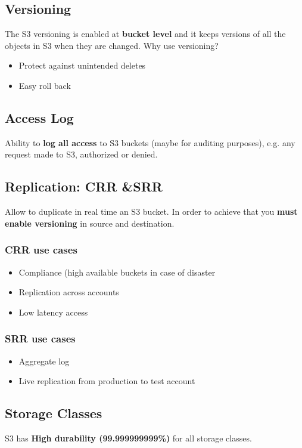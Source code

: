 \subsection{Versioning}\label{subsec:versioning}
The S3 versioning is enabled at \textbf{bucket level} and it keeps versions of all the objects in S3 when they are changed.
Why use versioning?
\begin{itemize}
	\item{Protect against unintended deletes}
	\item{Easy roll back}
\end{itemize}

\subsection{Access Log}\label{subsec:access-log}
Ability to \textbf{log all access} to S3 buckets (maybe for auditing purposes), e.g\@. any request made to S3, authorized or denied.

\subsection{Replication: CRR \&SRR}\label{subsec:replication-crr-srr}
Allow to duplicate in real time an S3 bucket.
In order to achieve that you \textbf{must enable versioning} in source and destination.
\subsubsection{CRR use cases}
\begin{itemize}
	\item{Compliance (high available buckets in case of disaster}
	\item{Replication across accounts}
	\item{Low latency access}
\end{itemize}
\subsubsection{SRR use cases}
\begin{itemize}
	\item{Aggregate log}
	\item{Live replication from production to test account}
\end{itemize}

\subsection{Storage Classes}\label{subsec:storage-classes}
S3 has \textbf{High durability (99.999999999\%)} for all storage classes.

